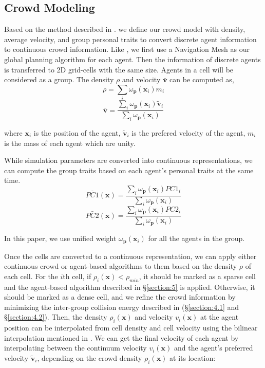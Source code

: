 \documentclass[conference]{acmsiggraph}
\begin{document}
\subsection{Crowd Modeling}
\label{section:3.2}
Based on the method described in \cite{Narain:2009}. we define our crowd model with density, average velocity, and group personal traits to convert discrete agent information to continuous crowd information. Like \cite{Narain:2009}, we first use a Navigation Mesh as our global planning algorithm for each agent. Then the information of discrete agents is transferred to 2D grid-cells with the same size. Agents in a cell will be considered as a group. The density $\rho$ and velocity $\bar{\textbf{v}}$ can be computed as,
\begin{equation}
\label{eq:2}
 \rho = \sum_{i} \omega_\textbf{p}(\textbf{x}_i)m_i
\end{equation}
\begin{equation}
\label{eq:3}
 \bar{\textbf{v}} = \frac{\sum_{i} \omega_\textbf{p}(\textbf{x}_i)\tilde{\textbf{v}}_i}{\sum_{i} \omega_\textbf{p}(\textbf{x}_i)}
\end{equation} 

where $\textbf{x}_i$ is the position of the agent, $\tilde{\textbf{v}}_i$ is the prefered velocity of the agent, $m_i$ is the mass of each agent which are unity. 

While simulation parameters are converted into continuous representations, we can compute the group traits based on each agent’s personal traits at the same time. 
\begin{equation}
\label{eq:4}
 \bar{PC1}(\textbf{x}) = \frac{\sum_{i} \omega_\textbf{p}(\textbf{x}_i)PC1_i}{\sum_{i} \omega_\textbf{p}(\textbf{x}_i)}
\end{equation} 
\begin{equation}
\label{eq:5}
 \bar{PC2}(\textbf{x}) = \frac{\sum_{i} \omega_\textbf{p}(\textbf{x}_i)PC2_i}{\sum_{i} \omega_\textbf{p}(\textbf{x}_i)}
\end{equation} 

In this paper, we use unified weight $\omega_\textbf{p}(\textbf{x}_i)$ for all the agents in the group.

Once the cells are converted to a continuous representation, we can apply either continuous crowd or agent-based algorithms to them based on the density $\rho$ of each cell. For the $i$th cell, if $\rho_i(\textbf{x})<\rho_{min}$, it should be marked as a sparse cell and the agent-based algorithm described in \S\ref{section:5} is applied. Otherwise, it should be marked as a dense cell, and we refine the crowd information by minimizing the inter-group collision energy described in (\S\ref{section:4.1} and \S\ref{section:4.2}). Then, the density $\rho_i(\textbf{x})$ and velocity $v_i(\textbf{x})$ at the agent position can be interpolated from cell density and cell velocity using the bilinear interpolation mentioned in \cite{Treuille:2006}. We can get the final velocity of each agent by interpolating between the continuum velocity $v_i(\textbf{x})$ and the agent's preferred velocity $\tilde{\textbf{v}}_i$, depending on the crowd density $\rho_i(\textbf{x})$ at its location:
\end{document}
